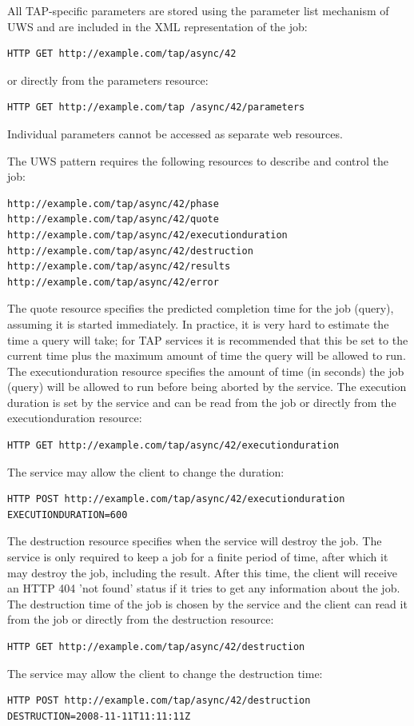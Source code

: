 \documentclass[11pt,letter]{ivoa}
\begin{document}
All TAP-specific parameters are stored using the parameter list mechanism of 
UWS and are included in the XML representation of the job:
\begin{verbatim}
HTTP GET http://example.com/tap/async/42
\end{verbatim}
or directly from the parameters resource:
\begin{verbatim}
HTTP GET http://example.com/tap /async/42/parameters
\end{verbatim}
Individual parameters cannot be accessed as separate web resources.

The UWS pattern requires the following resources to describe and control the 
job:
\begin{verbatim}
http://example.com/tap/async/42/phase
http://example.com/tap/async/42/quote
http://example.com/tap/async/42/executionduration
http://example.com/tap/async/42/destruction
http://example.com/tap/async/42/results
http://example.com/tap/async/42/error
\end{verbatim}
The quote resource specifies the predicted completion time for the job (query), 
assuming it is started immediately. In practice, it is very hard to estimate the 
time a query will take; for TAP services it is recommended that this be set to 
the current time plus the maximum amount of time the query will be allowed to 
run. The executionduration resource specifies the amount of time (in seconds) 
the job (query) will be allowed to run before being aborted by the service. The 
execution duration is set by the service and can be read from the job or 
directly from the executionduration resource:

\begin{verbatim}
HTTP GET http://example.com/tap/async/42/executionduration
\end{verbatim}
The service may allow the client to change the duration:
\begin{verbatim}
HTTP POST http://example.com/tap/async/42/executionduration
EXECUTIONDURATION=600
\end{verbatim}

The destruction resource specifies when the service will destroy the job. The 
service is only required to keep a job for a finite period of time, after which 
it may destroy the job, including the result. After this time, the client will 
receive an HTTP 404 'not found' status if it tries to get any information about 
the job. The destruction time of the job is chosen by the service and the client 
can read it from the job or directly from the destruction resource:
\begin{verbatim}
HTTP GET http://example.com/tap/async/42/destruction
\end{verbatim}
The service may allow the client to change the destruction time:
\begin{verbatim}
HTTP POST http://example.com/tap/async/42/destruction
DESTRUCTION=2008-11-11T11:11:11Z
\end{verbatim}
\end{document}
